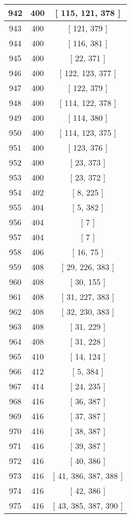 \begin{center}
\begin{longtable}[H]{|| c c c ||}
\hline
942 & 400 & [ 115, 121, 378 ] \\ 
\hline
943 & 400 & [ 121, 379 ] \\ 
\hline
944 & 400 & [ 116, 381 ] \\ 
\hline
945 & 400 & [ 22, 371 ] \\ 
\hline
946 & 400 & [ 122, 123, 377 ] \\ 
\hline
947 & 400 & [ 122, 379 ] \\ 
\hline
948 & 400 & [ 114, 122, 378 ] \\ 
\hline
949 & 400 & [ 114, 380 ] \\ 
\hline
950 & 400 & [ 114, 123, 375 ] \\ 
\hline
951 & 400 & [ 123, 376 ] \\ 
\hline
952 & 400 & [ 23, 373 ] \\ 
\hline
953 & 400 & [ 23, 372 ] \\ 
\hline
954 & 402 & [ 8, 225 ] \\ 
\hline
955 & 404 & [ 5, 382 ] \\ 
\hline
956 & 404 & [ 7 ] \\ 
\hline
957 & 404 & [ 7 ] \\ 
\hline
958 & 406 & [ 16, 75 ] \\ 
\hline
959 & 408 & [ 29, 226, 383 ] \\ 
\hline
960 & 408 & [ 30, 155 ] \\ 
\hline
961 & 408 & [ 31, 227, 383 ] \\ 
\hline
962 & 408 & [ 32, 230, 383 ] \\ 
\hline
963 & 408 & [ 31, 229 ] \\ 
\hline
964 & 408 & [ 31, 228 ] \\ 
\hline
965 & 410 & [ 14, 124 ] \\ 
\hline
966 & 412 & [ 5, 384 ] \\ 
\hline
967 & 414 & [ 24, 235 ] \\ 
\hline
968 & 416 & [ 36, 387 ] \\ 
\hline
969 & 416 & [ 37, 387 ] \\ 
\hline
970 & 416 & [ 38, 387 ] \\ 
\hline
971 & 416 & [ 39, 387 ] \\ 
\hline
972 & 416 & [ 40, 386 ] \\ 
\hline
973 & 416 & [ 41, 386, 387, 388 ] \\ 
\hline
974 & 416 & [ 42, 386 ] \\ 
\hline
975 & 416 & [ 43, 385, 387, 390 ] \\ 
\hline

\end{longtable}
\end{center}
